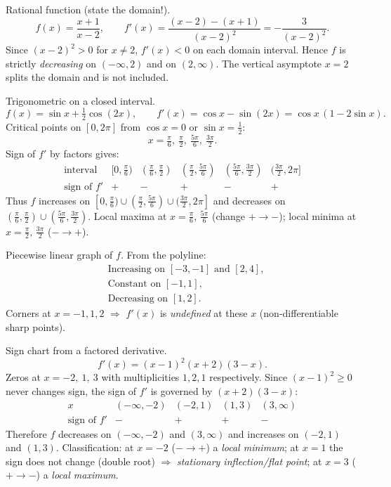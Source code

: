 \documentclass[11pt]{article}
\def\textbf#1{#1}%
\begin{document}
\begin{solution}
\textbf{Rational function (state the domain!).}
\[
f(x)=\frac{x+1}{x-2},\qquad f'(x)=\frac{(x-2)-(x+1)}{(x-2)^{2}}=\boxed{-\frac{3}{(x-2)^{2}}}.
\]
Since $(x-2)^2>0$ for $x\ne2$, $f'(x)<0$ on each domain interval.  
Hence $f$ is strictly \emph{decreasing} on $(-\infty,2)$ and on $(2,\infty)$.  
The vertical asymptote $x=2$ splits the domain and is not included.
\end{solution}

\begin{solution}
\textbf{Trigonometric on a closed interval.}
\[
f(x)=\sin x+\tfrac12\cos(2x),\qquad f'(x)=\cos x-\sin(2x)=\cos x\,(1-2\sin x).
\]
Critical points on $[0,2\pi]$ from $\cos x=0$ or $\sin x=\tfrac12$:
\[
x=\boxed{\tfrac{\pi}{6},\ \tfrac{\pi}{2},\ \tfrac{5\pi}{6},\ \tfrac{3\pi}{2}}.
\]
Sign of $f'$ by factors gives:
\[
\begin{array}{c|ccccc}
\text{interval} & [0,\tfrac{\pi}{6}) & (\tfrac{\pi}{6},\tfrac{\pi}{2}) & (\tfrac{\pi}{2},\tfrac{5\pi}{6}) &
(\tfrac{5\pi}{6},\tfrac{3\pi}{2}) & (\tfrac{3\pi}{2},2\pi] \\ \hline
\text{sign of } f' & + & - & + & - & +
\end{array}
\]
Thus $f$ increases on $[0,\tfrac{\pi}{6})\cup(\tfrac{\pi}{2},\tfrac{5\pi}{6})\cup(\tfrac{3\pi}{2},2\pi]$ and decreases on $(\tfrac{\pi}{6},\tfrac{\pi}{2})\cup(\tfrac{5\pi}{6},\tfrac{3\pi}{2})$.  
Local maxima at $x=\tfrac{\pi}{6},\,\tfrac{5\pi}{6}$ (change $+\to-$); local minima at $x=\tfrac{\pi}{2},\,\tfrac{3\pi}{2}$ ($-\to+$).
\end{solution}

\begin{solution}
\textbf{Piecewise linear graph of $f$.}
From the polyline:
\[
\begin{aligned}
&\text{Increasing on }[-3,-1]\text{ and }[2,4],\\
&\text{Constant on }[-1,1],\\
&\text{Decreasing on }[1,2].
\end{aligned}
\]
Corners at $x=-1,1,2$ $\Rightarrow$ $f'(x)$ is \emph{undefined} at these $x$ (non-differentiable sharp points).
\end{solution}

\begin{solution}
\textbf{Sign chart from a factored derivative.}
\[
f'(x)=(x-1)^{2}(x+2)(3-x).
\]
Zeros at $x=-2,\ 1,\ 3$ with multiplicities $1,2,1$ respectively.  Since $(x-1)^2\ge 0$ never changes sign, the sign of $f'$ is governed by $(x+2)(3-x)$:
\[
\begin{array}{c|cccc}
x & (-\infty,-2) & (-2,1) & (1,3) & (3,\infty)\\ \hline
\text{sign of } f' & - & + & + & -
\end{array}
\]
Therefore $f$ decreases on $(-\infty,-2)$ and $(3,\infty)$ and increases on $(-2,1)$ and $(1,3)$.  
Classification: at $x=-2$ ($-\to+$) a \emph{local minimum}; at $x=1$ the sign does not change (double root) $\Rightarrow$ \emph{stationary inflection/flat point}; at $x=3$ ($+\to-$) a \emph{local maximum}.
\end{solution}
\end{document}
